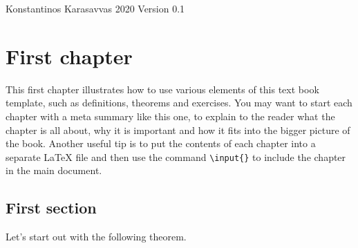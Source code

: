 \documentclass{tstextbook}
\begin{document}
       {Konstantinos Karasavvas}
       {}
       {2020}
       {}{}{}
       {Version 0.1}
       {}







\chapter{First chapter}

\begin{summary}
  This first chapter illustrates how to use various elements of this
  text book template, such as definitions, theorems and exercises. You
  may want to start each chapter with a meta summary like this one, to
  explain to the reader what the chapter is all about, why it is
  important and how it fits into the bigger picture of the
  book. Another useful tip is to put the contents of each chapter into
  a separate \LaTeX{} file and then use the command
  \texttt{\textbackslash{}input\{\}} to include the chapter in the
  main document.
\end{summary}

\section{First section}

Let's start out with the following theorem.
\end{document}
